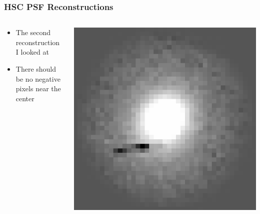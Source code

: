 \documentclass{beamer}
\begin{document}
\frame
{
    \frametitle{HSC PSF Reconstructions}

 
    \begin{columns}
        \begin{column}{0.5\textwidth}
            \begin{itemize}

                \item The second reconstruction I looked at

                \item There should be no negative pixels near the center

            \end{itemize}
        \end{column}
        \begin{column}{0.5\textwidth}
            \includegraphics[width=\textwidth]{tract008766-patch66-r-object1000.png}
        \end{column}
    \end{columns}
}
\end{document}
